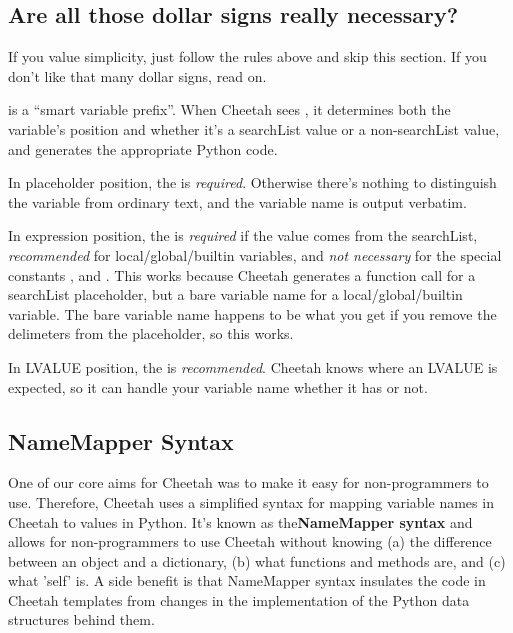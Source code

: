 \subsection{Are all those dollar signs really necessary?}
\label{language.placeholders.dollar-signs}

If you value simplicity, just follow the \code{\$} rules above and skip this
section.  If you don't like that many dollar signs, read on.

\code{\$} is a ``smart variable prefix''.  When Cheetah sees \code{\$}, it
determines both the variable's position and whether it's a searchList value or
a non-searchList value, and generates the appropriate Python code.  

In placeholder position, the \code{\$} is {\em required}.  Otherwise there's
nothing to distinguish the variable from ordinary text, and the variable name
is output verbatim.

In expression position, the \code{\$} is {\em required} if the value comes from
the searchList, {\em recommended} for local/global/builtin variables, and 
{\em not necessary} for the special constants ,  and
.  This works because Cheetah generates a function call for a
searchList placeholder, but a bare variable name for a local/global/builtin
variable.  The bare variable name happens to be what you get if you remove the
delimeters from the placeholder, so this works.

In LVALUE position, the \code{\$} is {\em recommended}.  Cheetah knows where
an LVALUE is expected, so it can handle your variable name whether it has
\code{\$} or not.


\subsection{NameMapper Syntax}
\label{language.namemapper}

One of our core aims for Cheetah was to make it easy for non-programmers to
use. Therefore, Cheetah uses a simplified syntax for mapping variable
names in Cheetah to values in Python. It's known as the{\bf NameMapper syntax}
and allows for non-programmers to use Cheetah without knowing (a)
the difference between an object and a dictionary, (b) what functions
and methods are, and (c) what 'self' is. A side benefit is that NameMapper
syntax insulates the code in Cheetah templates from changes in the implementation
of the Python data structures behind them.

